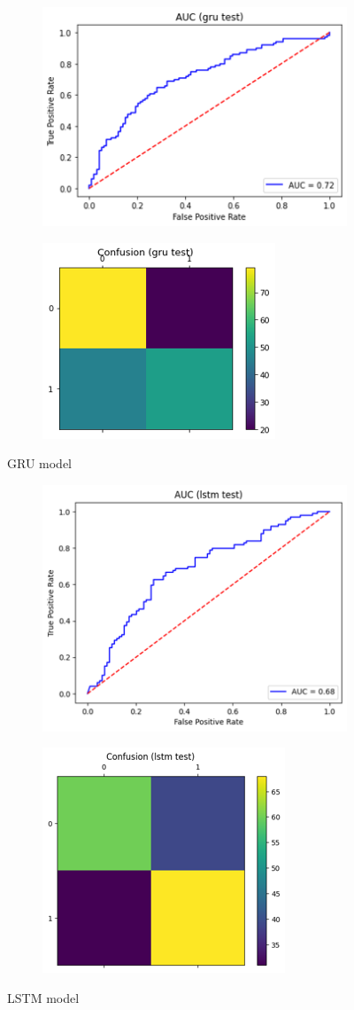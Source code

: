 \documentclass[format=sigconf, nonacm=true, review=false, screen=true]{acmart}
\begin{document}
\begin{figure}[H]
     \centering
     \begin{subfigure}
         \centering
         \includegraphics[width=0.24\columnwidth]{figures/gru-roc.png}
     \end{subfigure}
     \begin{subfigure}
         \centering
         \includegraphics[width=0.24\columnwidth]{figures/gru-cm.png}
     \end{subfigure}
     \caption{GRU model}
     \label{fig:gru-roc-cm}
     
     \centering
     \begin{subfigure}
         \centering
         \includegraphics[width=0.24\columnwidth]{figures/lstm-roc.png}
     \end{subfigure}
     \begin{subfigure}
         \centering
         \includegraphics[width=0.24\columnwidth]{figures/lstm-cm.png}
     \end{subfigure}
     \caption{LSTM model}
     \label{fig:lstm-roc-cm}


\end{figure}
\end{document}
